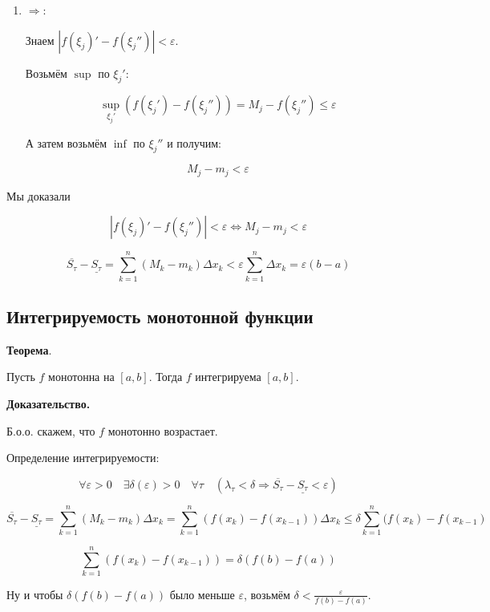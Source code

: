 \documentclass[a4paper]{article}
\begin{document}
\begin{definit}
\begin{hproof}
\begin{enumerate}
\item $\Rightarrow$:

Знаем $|f(\xi_j)' - f(\xi_j'')| < \varepsilon$.

Возьмём $\sup$ по $\xi_j'$:

\[
	\sup_{\xi_j'}(f(\xi_j') - f(\xi_j'')) = M_j - f(\xi_j'') \leq \varepsilon
\]

А затем возьмём $\inf$ по $\xi_j''$ и получим:

\[
M_j - m_j < \varepsilon
\]

\end{enumerate}

Мы доказали 

\[
|f(\xi_j)' - f(\xi_j'')| < \varepsilon \Leftrightarrow M_j - m_j < \varepsilon
\]

\[
\overline{S_\tau} - \underline{S_\tau} = \sum_{k=1}^n (M_k-m_k) \Delta x_k < \varepsilon \sum_{k=1}^n \Delta x_k = \varepsilon (b-a)
\]
\end{hproof}


\end{definit}


\begin{definit}
\subsection*{Интегрируемость монотонной функции}

\begin{htheorem}\textbf{Теорема}.

Пусть $f$ монотонна на $[a,b]$. Тогда $f$ интегрируема $[a,b]$.
\end{htheorem}

\begin{hproof}\textbf{Доказательство.}

Б.о.о. скажем, что $f$ монотонно возрастает.

Определение интегрируемости:

\[
\forall \varepsilon > 0 \quad \exists \delta(\varepsilon) > 0 \quad \forall \tau \quad (\lambda_\tau < \delta \Rightarrow \overline{S_\tau} - \underline{S_\tau} < \varepsilon)
\]

\[
\overline{S_\tau} - \underline{S_\tau} = \sum_{k=1}^n (M_k-m_k) \Delta x_k = \sum_{k=1}^n (f(x_k) - f(x_{k-1})) \Delta x_k \leq \delta \sum_{k=1}^n (f(x_k) - f(x_{k-1})
\]

\[
\sum_{k=1}^n (f(x_k) - f(x_{k-1})) = \delta (f(b)-f(a))
\]

Ну и чтобы $\delta (f(b)-f(a))$ было меньше $\varepsilon$, возьмём $\delta < \frac{\varepsilon}{f(b)-f(a)}$.
\end{hproof}
\end{definit}
\end{document}
